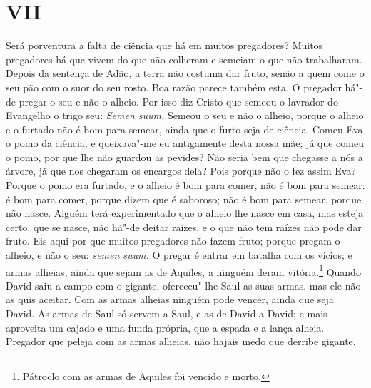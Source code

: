 \section*{VII}

Será porventura a falta de ciência que há em muitos pregadores? Muitos
pregadores há que vivem do que não colheram e semeiam o que não
trabalharam. Depois da sentença de Adão, a terra não costuma dar fruto,
senão a quem come o seu pão com o suor do seu rosto. Boa razão parece
também esta. O pregador há"-de pregar o seu e não o alheio. Por isso diz
Cristo que semeou o lavrador do Evangelho o trigo seu: \emph{Semen
suum.} Semeou o seu e não o alheio, porque o alheio e o furtado não é
bom para semear, ainda que o furto seja de ciência. Comeu Eva o pomo da
ciência, e queixava"-me eu antigamente desta nossa mãe; já que comeu o
pomo, por que lhe não guardou as pevides? Não seria bem que chegasse a
nós a árvore, já que nos chegaram os encargos dela? Pois porque não o
fez assim Eva? Porque o pomo era furtado, e o alheio é bom para
comer, não é bom para semear: é bom para comer, porque dizem que é
saboroso; não é bom para semear, porque não nasce. Alguém terá
experimentado que o alheio lhe nasce em casa, mas esteja certo, que se
nasce, não há"-de deitar raízes, e o que não tem raízes não pode dar
fruto. Eis aqui por que muitos pregadores não fazem fruto; porque pregam
o alheio, e não o seu: \emph{semen suum.} O pregar é entrar em batalha
com os vícios; e armas alheias, ainda que sejam as de Aquiles, a ninguém
deram vitória.\footnote{Pátroclo com as armas de Aquiles foi vencido e morto.} Quando David saiu a campo com o gigante, ofereceu"-lhe
Saul as suas armas, mas ele não as quis aceitar. Com as armas alheias ninguém
pode vencer, ainda que seja David. As armas de Saul só servem a Saul, e
as de David a David; e mais aproveita um cajado e uma funda própria, que
a espada e a lança alheia. Pregador que peleja com as armas alheias, não
hajais medo que derribe gigante.


